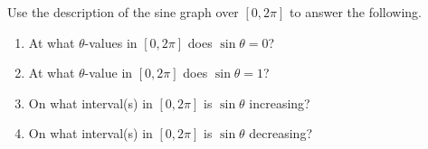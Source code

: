 \documentclass[10pt]{article}
\begin{document}
\vspace{0.1in}

\begin{practicebox}
Use the description of the sine graph over $[0,2\pi]$ to answer the following.

\begin{enumerate}[leftmargin=1.5em, itemsep=10pt]
    \item At what $\theta$-values in $[0,2\pi]$ does $\sin\theta=0$?


    \item At what $\theta$-value in $[0,2\pi]$ does $\sin\theta=1$?


    \item On what interval(s) in $[0,2\pi]$ is $\sin\theta$ increasing?


    \item On what interval(s) in $[0,2\pi]$ is $\sin\theta$ decreasing?

\end{enumerate}
\end{practicebox}
\end{document}
